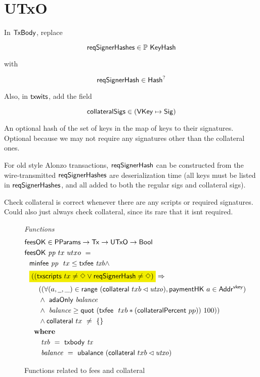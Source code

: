 \section{UTxO}
\label{sec:utxo}

In $\mathsf{TxBody}$, replace

\[\mathsf{reqSignerHashes} \in \mathbb{P}~\mathsf{KeyHash} \]

with

\[ \mathsf{reqSignerHash} \in \mathsf{Hash}^? \]

Also, in $\mathsf{txwits}$, add the field

\[\mathsf{collateralSigs} \in (\mathsf{VKey} \mapsto \mathsf{Sig})\]

An optional hash of the set of keys in the map of keys to their signatures.
Optional because we may not require any signatures other than the collateral ones.

For old style Alonzo transactions,
$\mathsf{reqSignerHash}$ can be constructed from the wire-transmitted $\mathsf{reqSignerHashes}$
are deserialization time (all keys must be listed in $\mathsf{reqSignerHashes}$, and all
added to both the regular sigs and collateral sigs).

Check collateral is correct whenever there are any scripts or required signatures. Could also
just always check collateral, since its rare that it isnt required.

\begin{figure*}[htb]
  \emph{Functions}
  \begin{align*}
    & \fun{feesOK} \in \PParams \to \Tx \to \UTxO \to \Bool  \\
    & \fun{feesOK}~\var{pp}~tx~utxo~= \\
    &~~      \minfee{pp}~{tx} \leq \txfee{txb} \wedge \\
    &~~ \hldiff{((\fun{txscripts}~tx \neq \Nothing \vee \fun{reqSignerHash} \neq \Nothing)} \Rightarrow \\
    &~~~~~~((\forall (a, \wcard, \_) \in \fun{range}~(\fun{collateral}~{txb} \restrictdom \var{utxo}), \fun{paymentHK}~a \in \AddrVKey) \\
    &~~~~~~\wedge~ \fun{adaOnly}~\var{balance} \\
    &~~~~~~\wedge~ \var{balance} \geq \fun{quot}~(\txfee~{txb} * (\fun{collateralPercent}~pp))~100)) \\
    &~~~~~~\wedge \fun{collateral}~{tx}~ \neq~\{\} \\
    &~~      \where \\
    & ~~~~~~~ \var{txb}~=~\txbody{tx} \\
    & ~~~~~~~ \var{balance}~=~\fun{ubalance}~(\fun{collateral}~{txb} \restrictdom \var{utxo})
  \end{align*}
  \caption{Functions related to fees and collateral}
  \label{fig:functions:utxo}
\end{figure*}

